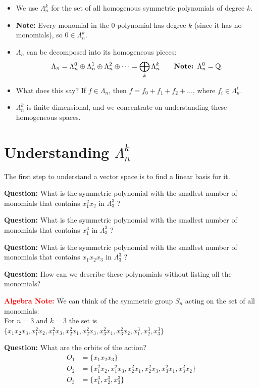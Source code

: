 \documentclass[12pt]{memoir}
\begin{document}
\begin{itemize}[label=$\diamond$]
    \item We use $\Lambda_n^k$ for the set of all homogenous symmetric polynomials of degree $k$.
    \item \textbf{Note:} Every monomial in the $0$ polynomial has degree $k$ (since it has no monomials), so $0 \in \Lambda_n^k$.
    \item $\Lambda_n$ can be decomposed into its homogeneous pieces:
    \[
    \Lambda_n = \Lambda_n^0 \oplus \Lambda_n^1 \oplus \Lambda_n^2 \oplus \dots = \bigoplus_k \Lambda_n^k \qquad \text{\textbf{Note: }} \Lambda_n^0 = \mathbb{Q}.
    \]
    \item What does this say? If $f \in \Lambda_n$, then $f = f_0 + f_1 + f_2 + \dots$, where $f_i \in \Lambda_n^i$.
    \item $\Lambda_n^k$ is finite dimensional, and we concentrate on understanding these homogeneous spaces.
\end{itemize}

\newpage

\section{Understanding \texorpdfstring{$\Lambda_n^k$}{Lambda\_n\^{}k}}

The first step to understand a vector space is to find a linear basis for it.

\textbf{Question:} What is the symmetric polynomial with the smallest number of monomials that contains $x_1^2 x_2$ in $\Lambda_3^3$ ?

\textbf{Question:} What is the symmetric polynomial with the smallest number of monomials that contains $x_1^3$ in $\Lambda_3^3$ ?

\textbf{Question:} What is the symmetric polynomial with the smallest number of monomials that contains $x_1 x_2 x_3$ in $\Lambda_3^3$ ?

\textbf{Question:} How can we describe these polynomials without listing all the monomials?

\textcolor{red}{\textbf{Algebra Note:}} We can think of the symmetric group $S_n$ acting on the set of all monomials:\\
For $n = 3$ and $k = 3$ the set is $\{x_1 x_2 x_3, x_1^2 x_2, x_1^2 x_3, x_2^2 x_1, x_2^2 x_3, x_3^2 x_1, x_3^2 x_2, x_1^3, x_2^3, x_3^3\}$

\textbf{Question:} What are the orbits of the action?
\begin{align*}
    O_1 &= \{x_1 x_2 x_3\}\\
    O_2 &= \{x_1^2 x_2, x_1^2 x_3, x_2^2 x_1, x_2^2 x_3, x_3^2 x_1, x_3^2 x_2\}\\
    O_3 &= \{x_1^3, x_2^3, x_3^3\}
\end{align*}
\end{document}
